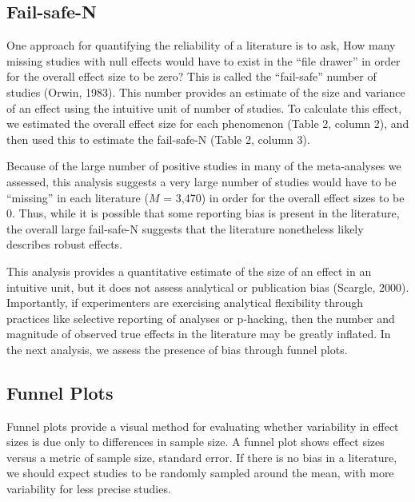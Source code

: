 \documentclass[9pt,twocolumn,twoside,lineno]{pnas-new}
\begin{document}
\subsection*{Fail-safe-N}\label{fail-safe-n}

One approach for quantifying the reliability of a literature is to ask,
How many missing studies with null effects would have to exist in the
\enquote{file drawer} in order for the overall effect size to be zero?
This is called the \enquote{fail-safe} number of studies (Orwin, 1983).
This number provides an estimate of the size and variance of an effect
using the intuitive unit of number of studies. To calculate this effect,
we estimated the overall effect size for each phenomenon (Table 2,
column 2), and then used this to estimate the fail-safe-N (Table 2,
column 3).

Because of the large number of positive studies in many of the
meta-analyses we assessed, this analysis suggests a very large number of
studies would have to be \enquote{missing} in each literature (\(M\) =
3,470) in order for the overall effect sizes to be 0. Thus, while it is
possible that some reporting bias is present in the literature, the
overall large fail-safe-N suggests that the literature nonetheless
likely describes robust effects.

This analysis provides a quantitative estimate of the size of an effect
in an intuitive unit, but it does not assess analytical or publication
bias (Scargle, 2000). Importantly, if experimenters are exercising
analytical flexibility through practices like selective reporting of
analyses or p-hacking, then the number and magnitude of observed true
effects in the literature may be greatly inflated. In the next analysis,
we assess the presence of bias through funnel plots.






\subsection*{Funnel Plots}\label{funnel-plots}

Funnel plots provide a visual method for evaluating whether variability
in effect sizes is due only to differences in sample size. A funnel plot
shows effect sizes versus a metric of sample size, standard error. If
there is no bias in a literature, we should expect studies to be
randomly sampled around the mean, with more variability for less precise
studies.
\end{document}
